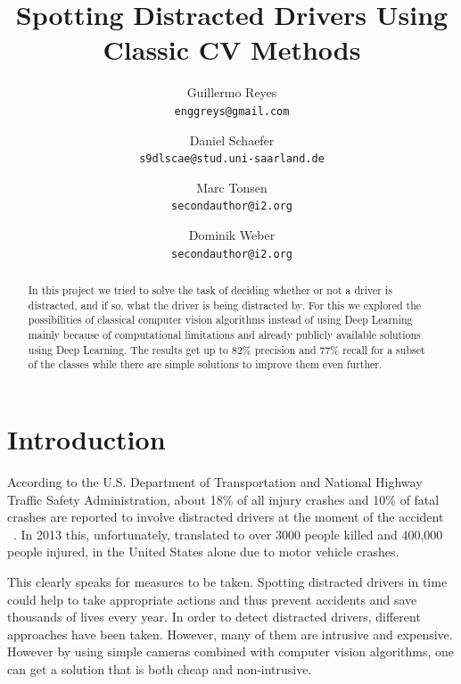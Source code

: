 \documentclass[10pt,twocolumn,letterpaper]{article}
\begin{document}
\title{Spotting Distracted Drivers Using Classic CV Methods}

\author{Guillermo Reyes\\
{\tt\small enggreys@gmail.com}
\and
Daniel Schaefer\\
{\tt\small s9dlscae@stud.uni-saarland.de}
\and
Marc Tonsen\\
{\tt\small secondauthor@i2.org}
\and
Dominik Weber\\
{\tt\small secondauthor@i2.org}
}

\maketitle

\begin{abstract}
   In this project we tried to solve the task of deciding whether or not a driver is distracted, and if so, what the driver is being distracted by. For this we explored the possibilities of classical computer vision algorithms instead of using Deep Learning mainly because of computational limitations and already publicly available solutions using Deep Learning. The results get up to 82\% precision and 77\% recall for a subset of the classes while there are simple solutions to improve them even further.
\end{abstract}


\section{Introduction}


According to the U.S. Department of Transportation and National Highway Traffic Safety Administration, about 18\% of all injury crashes and 10\% of fatal crashes are reported to involve distracted drivers at the moment of the accident ~\cite{knuthwebsite}. In 2013 this, unfortunately, translated to over 3000 people killed and 400,000 people injured, in the United States alone due to motor vehicle crashes.

This clearly speaks for measures to be taken. Spotting distracted drivers in time could help to take appropriate actions and thus prevent accidents and save thousands of lives every year. In order to detect distracted drivers, different approaches have been taken. However, many of them are intrusive and expensive. However by using simple cameras combined with computer vision algorithms, one can get a solution that is both cheap and non-intrusive.\\
\end{document}
